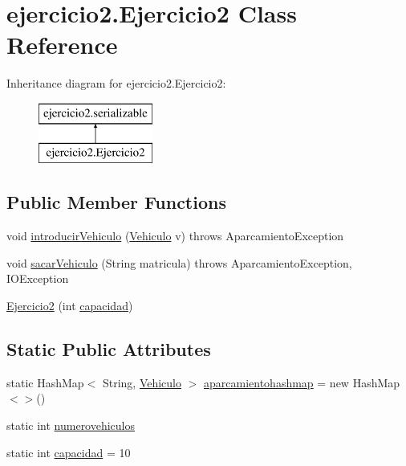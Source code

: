 \hypertarget{classejercicio2_1_1_ejercicio2}{}\section{ejercicio2.\+Ejercicio2 Class Reference}
\label{classejercicio2_1_1_ejercicio2}
Inheritance diagram for ejercicio2.\+Ejercicio2\+:\begin{figure}[H]
\begin{center}
\leavevmode
\includegraphics[height=2.000000cm]{classejercicio2_1_1_ejercicio2}
\end{center}
\end{figure}
\subsection*{Public Member Functions}
\begin{DoxyCompactItemize}
\item 
void \mbox{\hyperlink{classejercicio2_1_1_ejercicio2_aa1233af33b5de9cc49f3e2675057450a}{introducir\+Vehiculo}} (\mbox{\hyperlink{classejercicio2_1_1_vehiculo}{Vehiculo}} v)  throws Aparcamiento\+Exception 
\item 
void \mbox{\hyperlink{classejercicio2_1_1_ejercicio2_abdd1ba43b76660e71d07c129449fcf6f}{sacar\+Vehiculo}} (String matricula)  throws Aparcamiento\+Exception, I\+O\+Exception
\item 
\mbox{\hyperlink{classejercicio2_1_1_ejercicio2_a446f9b7f84e776b6fd05f60a9e97f3be}{Ejercicio2}} (int \mbox{\hyperlink{classejercicio2_1_1_ejercicio2_a67160aed137820bd3e65ebd3a709ace7}{capacidad}})
\end{DoxyCompactItemize}
\subsection*{Static Public Attributes}
\begin{DoxyCompactItemize}
\item 
static Hash\+Map$<$ String, \mbox{\hyperlink{classejercicio2_1_1_vehiculo}{Vehiculo}} $>$ \mbox{\hyperlink{classejercicio2_1_1_ejercicio2_aa5edc1e53d504e830b43940e31c3f33a}{aparcamientohashmap}} = new Hash\+Map $<$$>$()
\item 
static int \mbox{\hyperlink{classejercicio2_1_1_ejercicio2_a6c3fa58fad90cecd34b87678894782d6}{numerovehiculos}}
\item 
static int \mbox{\hyperlink{classejercicio2_1_1_ejercicio2_a67160aed137820bd3e65ebd3a709ace7}{capacidad}} = 10
\end{DoxyCompactItemize}


